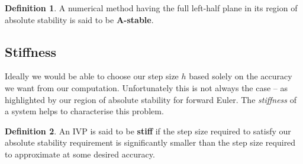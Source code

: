 \documentclass[12pt, twoside]{report}
\theoremstyle{plain}
\theoremstyle{definition}
\newtheorem{definition}{Definition}[chapter]
\theoremstyle{definition}
\begin{document}
            \begin{definition}
                A numerical method having the full left-half plane in its 
                region of absolute stability is said to be \textbf{A-stable}.
            \end{definition} 


        \subsection{Stiffness}
        \label{2_stiffness}
            Ideally we would be able to choose our step size $h$ based solely
            on the accuracy we want from our computation. Unfortunately this is
            not always the case -- as highlighted by our region of absolute
            stability for forward Euler. The \textit{stiffness} of a system
            helps to characterise this problem.

            \begin{definition}
                An IVP is said to be \textbf{stiff} if the step size required 
                to satisfy our absolute stability requirement is significantly
                smaller than the step size required to approximate at some 
                desired accuracy.
            \end{definition}
\end{document}
